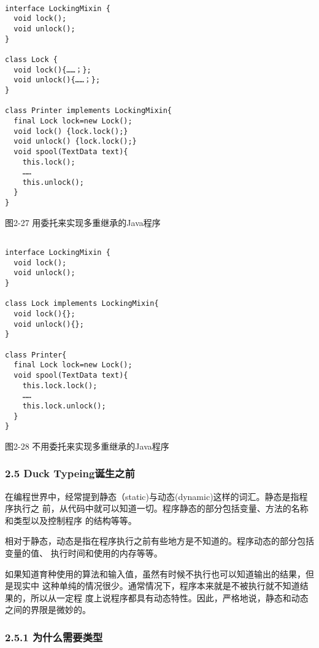 \documentclass[11pt]{ctexart}
\begin{document}
\lstset{language=org,label= ,caption= ,captionpos=b,numbers=none}
\begin{lstlisting}

interface LockingMixin {
  void lock();
  void unlock();
}

class Lock {
  void lock(){……；};
  void unlock(){……；};
}

class Printer implements LockingMixin{
  final Lock lock=new Lock();
  void lock() {lock.lock();}
  void unlock() {lock.lock();}
  void spool(TextData text){
    this.lock();
    ……
    this.unlock();
  }
}

\end{lstlisting}

图2-27 用委托来实现多重继承的Java程序

\lstset{language=org,label= ,caption= ,captionpos=b,numbers=none}
\begin{lstlisting}

interface LockingMixin {
  void lock();
  void unlock();
}

class Lock implements LockingMixin{
  void lock(){};
  void unlock(){};
}

class Printer{
  final Lock lock=new Lock();
  void spool(TextData text){
    this.lock.lock();
    ……
    this.lock.unlock();
  }
}

\end{lstlisting}

图2-28 不用委托来实现多重继承的Java程序
\subsubsection{2.5 Duck Typeing诞生之前}
\label{sec:org4794e3e}

在编程世界中，经常提到静态（static)与动态(dynamic)这样的词汇。静态是指程序执行之
前，从代码中就可以知道一切。程序静态的部分包括变量、方法的名称和类型以及控制程序
的结构等等。

相对于静态，动态是指在程序执行之前有些地方是不知道的。程序动态的部分包括变量的值、
执行时间和使用的内存等等。

如果知道育种使用的算法和输入值，虽然有时候不执行也可以知道输出的结果，但是现实中
这种单纯的情况很少。通常情况下，程序本来就是不被执行就不知道结果的，所以从一定程
度上说程序都具有动态特性。因此，严格地说，静态和动态之间的界限是微妙的。
\subsubsection{2.5.1 为什么需要类型}
\label{sec:org6004b2a}
\end{document}
